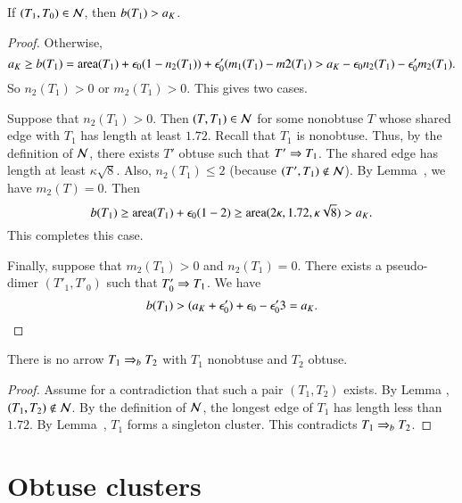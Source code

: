 \begin{lemma}  If $(T_1,T_0)\in \mathcal N$, then $b(T_1)>a_K$.
\end{lemma}

\begin{proof}  Otherwise,
\[
a_K \ge b(T_1) = {\operatorname{area}}(T_1) + \epsilon_0 (1 - n_2(T_1)) + \epsilon_0' (m_1(T_1)-m2(T_1) > a_K - \epsilon_0 n_2(T_1) - \epsilon_0' m_2(T_1).
\]
So $n_2(T_1) > 0$ or $m_2(T_1)>0$. This gives two cases.  

Suppose that $n_2(T_1) >0$.  Then $(T,T_1)\in\mathcal N$ for some nonobtuse $T$ whose shared edge with $T_1$ has length at least $1.72$.
Recall that $T_1$ is nonobtuse.  Thus, by the definition of $\mathcal N$, there exists $T'$ obtuse such that $T'\Rightarrow T_1$.  The shared edge
has length at least $\kappa\sqrt8$.  Also, $n_2(T_1)\le 2$ (because $(T',T_1)\not\in \mathcal N$).  By Lemma~, we have
$m_2(T)=0$.  Then
\[
b(T_1) \ge {\operatorname{area}}(T_1) + \epsilon_0 (1 - 2) \ge {\operatorname{area}} (2\kappa,1.72,\kappa\sqrt8) > a_K.
\]
This completes this case.

Finally, suppose that $m_2(T_1)>0$ and $n_2(T_1)=0$.  There exists a pseudo-dimer $(T'_1,T'_0)$ such that $T'_0\Rightarrow T_1$.
We have
\[
b(T_1) > (a_K + \epsilon_0') + \epsilon_0 -\epsilon_0'  3 = a_K.
\]
\end{proof}



\begin{lemma} 
  There is no arrow $T_1 \Rightarrow_{b} T_2$ with $T_1$ nonobtuse and $T_2$
  obtuse.
\end{lemma}

\begin{proof}  
  Assume for a contradiction that such a pair $(T_1,T_2)$ exists.
By Lemma , $(T_1,T_2)\not\in\mathcal N$.
By the definition of $\mathcal N$, the longest edge of $T_1$ has length
less than $1.72$.  By Lemma~, $T_1$ forms
a singleton cluster.  This contradicts $T_1\Rightarrow_{b} T_2$.
\end{proof}


\section{Obtuse clusters}



